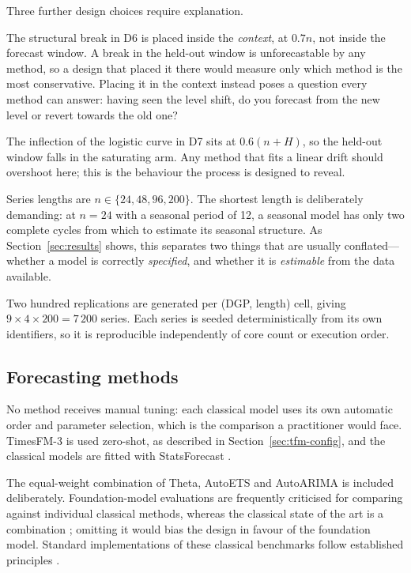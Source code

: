 \documentclass[11pt]{article}
\newcommand{\pkg}[1]{\textsf{#1}}
\providecommand{\sectionref}[1]{Section~\ref{#1}}
\begin{document}
Three further design choices require explanation.

The structural break in D6 is placed inside the \emph{context}, at $0.7n$, not inside the
forecast window. A break in the held-out window is unforecastable by any method, so a design
that placed it there would measure only which method is the most conservative. Placing it in
the context instead poses a question every method can answer: having seen the level shift, do
you forecast from the new level or revert towards the old one?

The inflection of the logistic curve in D7 sits at $0.6(n+H)$, so the held-out window falls in
the saturating arm. Any method that fits a linear drift should overshoot here; this is the
behaviour the process is designed to reveal.

Series lengths are $n \in \{24, 48, 96, 200\}$. The shortest length is deliberately demanding: at
$n=24$ with a seasonal period of 12, a seasonal model has only two complete cycles from which
to estimate its seasonal structure. As \sectionref{sec:results} shows, this separates two
things that are usually conflated---whether a model is correctly \emph{specified}, and whether
it is \emph{estimable} from the data available.

Two hundred replications are generated per (DGP, length) cell, giving
$9 \times 4 \times 200 = 7\,200$ series. Each series is seeded deterministically from its own
identifiers, so it is reproducible independently of core count or execution order.

\subsection{Forecasting methods}
\label{sec:methods}

No method receives manual tuning: each classical model uses its own automatic order and
parameter selection, which is the comparison a practitioner would face. TimesFM-3 is used
zero-shot, as described in \sectionref{sec:tfm-config}, and the classical models are fitted with
\pkg{StatsForecast} \citep{statsforecast}.

The equal-weight combination of Theta, AutoETS and AutoARIMA is included deliberately.
Foundation-model evaluations are frequently criticised for comparing against individual classical
methods, whereas the classical state of the art is a combination \citep{makridakis2020m4, petropoulos2022theory};
omitting it would bias the design in favour of the foundation model. Standard implementations of these
classical benchmarks follow established principles \citep{hyndman2021fpp}.
\end{document}
